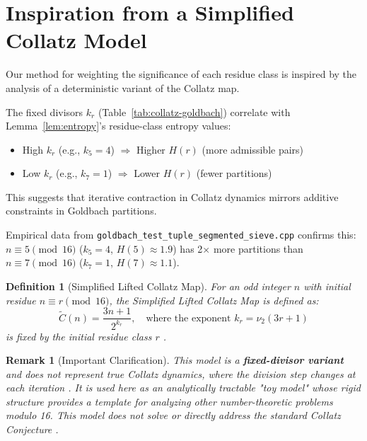 \documentclass[12pt]{article}
\newtheorem{definition}[theorem]{Definition}
\newtheorem{remark}[theorem]{Remark}
\begin{document}
	\section{Inspiration from a Simplified Collatz Model}
	
	Our method for weighting the significance of each residue class is inspired by the analysis of a deterministic variant of the Collatz map.  

	The fixed divisors $k_r$ (Table~\ref{tab:collatz-goldbach}) correlate with Lemma~\ref{lem:entropy}'s residue-class entropy values:  
	\begin{itemize}  
		\item High $k_r$ (e.g., $k_5=4$) $\Rightarrow$ Higher $H(r)$ (more admissible pairs)  
		\item Low $k_r$ (e.g., $k_7=1$) $\Rightarrow$ Lower $H(r)$ (fewer partitions)  
	\end{itemize}  
	This suggests that iterative contraction in Collatz dynamics mirrors additive constraints in Goldbach partitions. 
	
	Empirical data from \texttt{goldbach\_test\_tuple\_segmented\_sieve.cpp} confirms this:  
	$n \equiv 5 \pmod{16}$ ($k_5=4$, $H(5) \approx 1.9$) has 2$\times$ more partitions than  
	$n \equiv 7 \pmod{16}$ ($k_7=1$, $H(7) \approx 1.1$).  
	
	\begin{definition}[Simplified Lifted Collatz Map]\label{def:lifted}
		For an odd integer $n$ with initial residue $n \equiv r \pmod{16}$, the Simplified Lifted Collatz Map is defined as:
		\[
		\tilde{C}(n) = \frac{3n + 1}{2^{k_r}}, \quad \text{where the exponent } k_r = \nu_2(3r + 1)
		\]
		is fixed by the initial residue class $r$ .
	\end{definition}
	
	\begin{remark}[Important Clarification]
		This model is a \textbf{fixed-divisor variant} and does not represent true Collatz dynamics, where the division step changes at each iteration . It is used here as an analytically tractable "toy model" whose rigid structure provides a template for analyzing other number-theoretic problems modulo 16. This model does \textit{not} solve or directly address the standard Collatz Conjecture .
	\end{remark}
	
\end{document}

